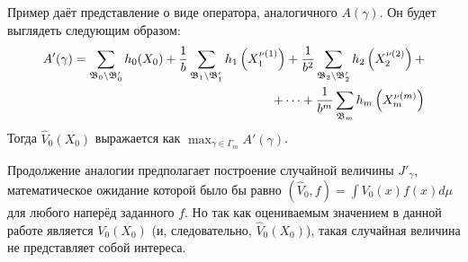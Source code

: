 Пример даёт представление о виде оператора, аналогичного $A(\gamma)$. Он будет выглядеть следующим образом:
\begin{equation}
\begin{aligned}
A'(\gamma) = \sum_{\mathfrak{B}_0\setminus\mathfrak{B}'_0}h_0(X_0) + \frac{1}{b}\sum_{\mathfrak{B}_1\setminus\mathfrak{B}'_1}h_1\left(X_1^{\nu(1)}\right) + \frac{1}{b^2}\sum_{\mathfrak{B}_2\setminus\mathfrak{B}'_2}h_2\left(X_2^{\nu(2)}\right) + \\
 + \cdots + \frac{1}{b^m}\sum_{\mathfrak{B}_m}h_m\left(X_m^{\nu(m)}\right)
\end{aligned}
\end{equation}
Тогда $\hat{V}_0(X_0)$ выражается как $\max_{\gamma\in\Gamma_m} A'\left(\gamma\right)$.

Продолжение аналогии предполагает построение случайной величины $J'_\gamma$, математическое ожидание которой было бы равно $(\hat{V}_0, f) = \int V_0(x)f(x)d\mu$ для любого наперёд заданного $f$. Но так как оцениваемым значением в данной работе является $V_0(X_0)$ (и, следовательно, $\hat{V}_0(X_0)$), такая случайная величина не представляет собой интереса.




